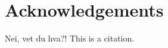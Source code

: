 \documentclass[main.tex]{subfiles}
\begin{document}
\section*{Acknowledgements}
Nei, vet du hva?!
This is a \cite{wirth1976} citation.
\end{document}
